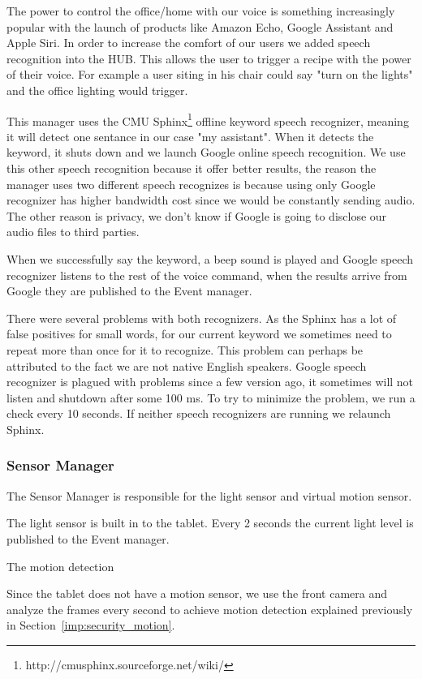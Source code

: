 The power to control the office/home with our voice is something increasingly popular with the launch of products like Amazon Echo, Google Assistant and Apple Siri. In order to increase the comfort of our users we added speech recognition into the HUB. This allows the user to trigger a recipe with the power of their voice. For example a user siting in his chair could say "turn on the lights" and the office lighting would trigger. 

This manager uses the CMU Sphinx\footnote{http://cmusphinx.sourceforge.net/wiki/} offline keyword speech recognizer, meaning it will detect one sentance in our case "my assistant". When it detects the keyword, it shuts down and we launch Google online speech recognition. We use this other speech recognition because it offer better results, the reason the manager uses two different speech recognizes is because using only Google recognizer has higher bandwidth cost since we would be constantly sending audio. The other reason is privacy, we don't know if Google is going to disclose our audio files to third parties.

When we successfully say the keyword, a beep sound is played and Google speech recognizer listens to the rest of the voice command, when the results arrive from Google they are published to the Event manager.

There were several problems with both recognizers. As the Sphinx has a lot of false positives for small words, for our current keyword we sometimes need to repeat more than once for it to recognize. This problem can perhaps be attributed to the fact we are not native English speakers. 
Google speech recognizer is plagued with problems since a few version ago, it sometimes will not listen and shutdown after some 100 ms. To try to minimize the problem, we run a check every 10 seconds. If neither speech recognizers are running we relaunch Sphinx.

\subsubsection{Sensor Manager}\label{sensor_manager_imp}

The Sensor Manager is responsible for the light sensor and virtual motion sensor.

The light sensor is built in to the tablet. Every 2 seconds the current light level is published to the Event manager. 

The motion detection 

Since the tablet does not have a motion sensor, we use the front camera and analyze the frames every second to achieve motion detection explained previously in Section~\ref{imp:security_motion}.

